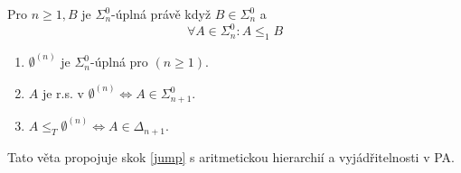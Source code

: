 \begin{definition}
	Pro $n \geq 1, B$ je $\Sigma_n^0$-úplná právě když $B \in \Sigma_n^0$ a
	\[ \forall A \in \Sigma_n^0: A \leq_1 B \]
\end{definition}

\begin{theorem}
	\begin{enumerate}
		\item $\emptyset^{(n)}$ je $\Sigma_n^0$-úplná pro $(n \geq 1)$.
		\item $A$ je r.s. v $\emptyset^{(n)} \iff A \in \Sigma_{n + 1}^0$.
		\item $A \leq_T \emptyset^{(n)} \iff A \in \Delta_{n + 1}$.
	\end{enumerate}

	Tato věta propojuje skok \cref{jump} s aritmetickou hierarchií a vyjádřitelnosti v PA.
\end{theorem}
